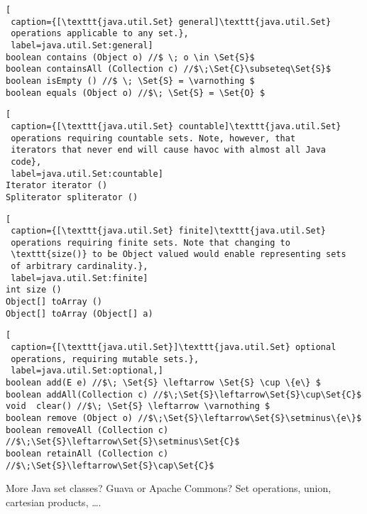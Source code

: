 \begin{lstlisting}[
 caption={[\texttt{java.util.Set} general]\texttt{java.util.Set} 
 operations applicable to any set.}, 
 label=java.util.Set:general]
boolean contains (Object o) //$ \; o \in \Set{S}$
boolean containsAll (Collection c) //$\;\Set{C}\subseteq\Set{S}$ 
boolean isEmpty () //$ \; \Set{S} = \varnothing $
boolean equals (Object o) //$\; \Set{S} = \Set{O} $
\end{lstlisting}
\begin{lstlisting}[
 caption={[\texttt{java.util.Set} countable]\texttt{java.util.Set} 
 operations requiring countable sets. Note, however, that 
 iterators that never end will cause havoc with almost all Java
 code}, 
 label=java.util.Set:countable]
Iterator iterator ()
Spliterator spliterator ()
\end{lstlisting}
\begin{lstlisting}[
 caption={[\texttt{java.util.Set} finite]\texttt{java.util.Set} 
 operations requiring finite sets. Note that changing to
 \texttt{size()} to be Object valued would enable representing sets
 of arbitrary cardinality.}, 
 label=java.util.Set:finite] 
int size () 
Object[] toArray ()
Object[] toArray (Object[] a)
\end{lstlisting}
\begin{lstlisting}[
 caption={[\texttt{java.util.Set}]\texttt{java.util.Set} optional
 operations, requiring mutable sets.}, 
 label=java.util.Set:optional,]
boolean add(E e) //$\; \Set{S} \leftarrow \Set{S} \cup \{e\} $
boolean addAll(Collection c) //$\;\Set{S}\leftarrow\Set{S}\cup\Set{C}$ 
void  clear() //$\; \Set{S} \leftarrow \varnothing $ 
boolean remove (Object o) //$\;\Set{S}\leftarrow\Set{S}\setminus\{e\}$
boolean removeAll (Collection c) //$\;\Set{S}\leftarrow\Set{S}\setminus\Set{C}$ 
boolean retainAll (Collection c) //$\;\Set{S}\leftarrow\Set{S}\cap\Set{C}$
\end{lstlisting}

More Java set classes? Guava or Apache Commons?
Set operations, union, cartesian products, \ldots.

\lstset{language=Clojure}

